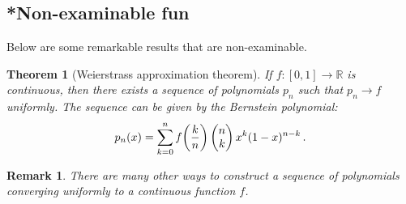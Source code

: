 \documentclass{article}
\theoremstyle{plain}\theoremheaderfont{\normalfont\itshape}\theorembodyfont{\rmfamily}\theoremseparator{.}\newtheorem*{rem}{Remark}\newtheorem*{ex}{Example}\newtheorem*{proof}{Proof}\newtheorem*{altp}{Alternative proof}
\theoremstyle{plain}\theoremheaderfont{\normalfont\bfseries}\theorembodyfont{\rmfamily}\theoremseparator{.}\newtheorem{thm}{Theorem}[section]\newtheorem{lem}[thm]{Lemma}\newtheorem{prop}[thm]{Proposition}\newtheorem*{cor}{Corollary}\newtheorem{defn}[thm]{Definition}\newtheorem{clm}[thm]{Claim}\newtheorem{clminproof}{Claim}
\theoremstyle{break}\theoremheaderfont{\normalfont\itshape}\theorembodyfont{\rmfamily}\theoremseparator{.\medskip}\newtheorem*{proofskip}{Proof}\newtheorem*{exs}{Examples}\newtheorem*{rems}{Remarks}
\theoremstyle{break}\theoremheaderfont{\normalfont\bfseries}\theorembodyfont{\rmfamily}\theoremseparator{.\medskip}\newtheorem{lemskip}[thm]{Lemma}\newtheorem{defnskip}[thm]{Definition}\newtheorem{propskip}[thm]{Proposition}\newtheorem{thmskip}[thm]{Theorem}
\begin{document}
    \subsection*{*Non-examinable fun}
    Below are some remarkable results that are non-examinable.
    \begin{thm}[Weierstrass approximation theorem]
        If \(f:[0,1]\to\mathbb{R}\) is continuous, then there exists a sequence of polynomials \(p_n\) such that \(p_n\to f\) uniformly. The sequence can be given by the \textit{Bernstein polynomial}:
        \[p_n(x)=\sum_{k=0}^{n}f\qty(\frac{k}{n})\begin{pmatrix}
            n \\ k
        \end{pmatrix}x^k(1-x)^{n-k}\,.\]
    \end{thm}
    \begin{rem}
        There are many other ways to construct a sequence of polynomials converging uniformly to a continuous function \(f\).
    \end{rem}
\end{document}
